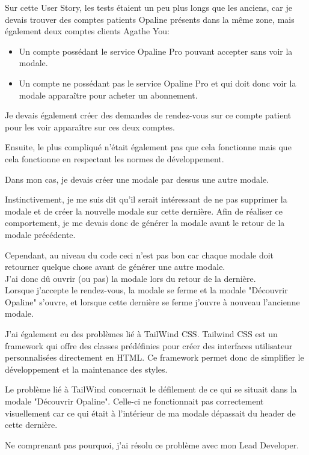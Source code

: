 \documentclass{article}
\begin{document}
Sur cette User Story, les tests étaient un peu plus longs que les anciens, car je devais trouver des comptes patients Opaline présents dans la même zone, mais également deux comptes clients Agathe You:

\begin{itemize}
    \item Un compte possédant le service Opaline Pro pouvant accepter sans voir la modale.
    \item Un compte ne possédant pas le service Opaline Pro et qui doit donc voir la modale apparaître pour acheter un abonnement.
\end{itemize}

Je devais également créer des demandes de rendez-vous sur ce compte patient pour les voir apparaître sur ces deux comptes.

Ensuite, le plus compliqué n'était également pas que cela fonctionne mais que cela fonctionne en respectant les normes de développement.

Dans mon cas, je devais créer une modale par dessus une autre modale.

Instinctivement, je me suis dit qu'il serait intéressant de ne pas supprimer la modale et de créer la nouvelle modale sur cette dernière. Afin de réaliser ce comportement, je me devais donc de générer la modale avant le retour de la modale précédente.

Cependant, au niveau du code ceci n'est pas bon car chaque modale doit retourner quelque chose avant de générer une autre modale. \\
J'ai donc dû ouvrir (ou pas) la modale lors du retour de la dernière. \\
Lorsque j'accepte le rendez-vous, la modale se ferme et la modale "Découvrir Opaline" s'ouvre, et lorsque cette dernière se ferme j'ouvre à nouveau l'ancienne modale.

J'ai également eu des problèmes lié à TailWind CSS. 
Tailwind CSS est un framework qui offre des classes prédéfinies pour créer des interfaces utilisateur personnalisées directement en HTML. Ce framework permet donc de simplifier le développement et la maintenance des styles.

Le problème lié à TailWind concernait le défilement de ce qui se situait dans la modale "Découvrir Opaline". Celle-ci ne fonctionnait pas correctement visuellement car ce qui était à l'intérieur de ma modale dépassait du header de cette dernière.

Ne comprenant pas pourquoi, j'ai résolu ce problème avec mon Lead Developer.
\end{document}
